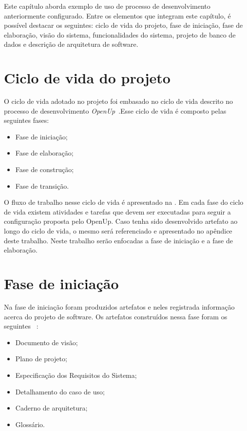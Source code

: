 Este capítulo aborda exemplo de uso de processo de desenvolvimento anteriormente configurado. Entre os elementos que integram este capítulo, é possível destacar os seguintes: ciclo de vida do projeto, fase de iniciação, fase de elaboração, visão do sistema, funcionalidades do sistema, projeto de banco de dados e descrição de arquitetura de software.

\section{Ciclo de vida do projeto}
O ciclo de vida adotado no projeto foi embasado no ciclo de vida descrito no processo de desenvolvimento  \emph{OpenUp}~\cite{openup}.Esse ciclo de vida é composto pelas seguintes fases:

\begin{itemize}
    \item Fase de iniciação;
    \item Fase de elaboração;
    \item Fase de construção;
    \item Fase de transição.
\end{itemize}

%

O fluxo de trabalho nesse ciclo de vida é apresentado na . Em cada fase do ciclo de vida existem atividades e tarefas que devem ser executadas para seguir a configuração proposta pelo OpenUp. Caso tenha sido desenvolvido  artefato ao longo do ciclo de vida, o mesmo será referenciado e apresentado no apêndice deste trabalho. Neste trabalho serão enfocadas a fase de iniciação e a fase de elaboração.

\section{Fase de iniciação}

Na fase de iniciação foram produzidos artefatos e neles registrada informação acerca do projeto de software. Os artefatos construídos nessa fase foram os seguintes ~\cite{openup}:
\begin{itemize}
    \item Documento de visão;
    \item Plano de projeto;
    \item Especificação dos Requisitos do Sistema;
    \item Detalhamento do caso de uso;
    \item Caderno de arquitetura;
    \item Glossário.
\end{itemize}

